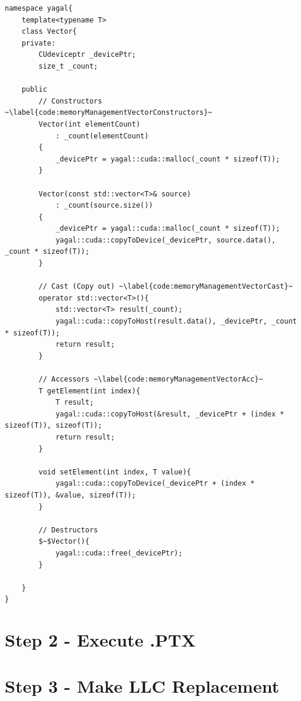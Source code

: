 

\begin{lstlisting}[caption={Vector class, showing only code relevant to memory management.}, label={code:memoryManagementVector}, mathescape]
namespace yagal{
    template<typename T>
    class Vector{
    private:
        CUdeviceptr _devicePtr;
        size_t _count;

    public
        // Constructors ~\label{code:memoryManagementVectorConstructors}~
        Vector(int elementCount)
            : _count(elementCount)
        {
            _devicePtr = yagal::cuda::malloc(_count * sizeof(T));
        }

        Vector(const std::vector<T>& source)
            : _count(source.size())
        {
            _devicePtr = yagal::cuda::malloc(_count * sizeof(T));
            yagal::cuda::copyToDevice(_devicePtr, source.data(), _count * sizeof(T));
        }

        // Cast (Copy out) ~\label{code:memoryManagementVectorCast}~
        operator std::vector<T>(){
            std::vector<T> result(_count);
            yagal::cuda::copyToHost(result.data(), _devicePtr, _count * sizeof(T));
            return result;
        }

        // Accessors ~\label{code:memoryManagementVectorAcc}~
        T getElement(int index){
            T result;
            yagal::cuda::copyToHost(&result, _devicePtr + (index * sizeof(T)), sizeof(T));
            return result;
        }

        void setElement(int index, T value){
            yagal::cuda::copyToDevice(_devicePtr + (index * sizeof(T)), &value, sizeof(T));
        }

        // Destructors
        $~$Vector(){
            yagal::cuda::free(_devicePtr);
        }

    }
}
\end{lstlisting}



\section{Step 2 - Execute .PTX}

\section{Step 3 - Make LLC Replacement}

